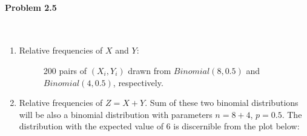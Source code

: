 \documentclass[12pt, letterpaper]{scrartcl}
\begin{document}
\paragraph*{Problem 2.5} \hfill\\
    \begin{enumerate}[((a))]
        \item Relative frequencies of $X$ and $Y$: 
        \begin{figure}[h!]
            \centering
            \hfill
            \vfill
            \caption{200 pairs of $(X_i, Y_i)$ drawn from $Binomial(8, 0.5)$ and $Binomial(4, 0.5)$, respectively.}
        \end{figure}
        \clearpage
        \item Relative frequencies of $Z=X+Y$. Sum of these two binomial distributions will be also a binomial distribution with parameters $n=8+4$, $p=0.5$. The distribution with the expected value of 6 is discernible from the plot below:

\end{enumerate}
\end{document}
